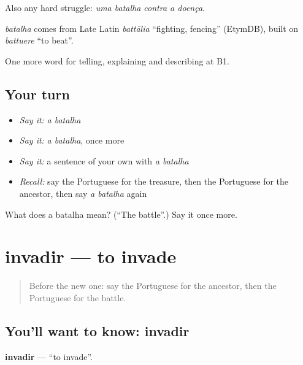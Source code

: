 Also any hard struggle: \emph{uma batalha contra a doença}.

\begin{cousinweb}
\emph{batalha} comes from Late Latin \emph{battālia} \textquotedblleft{}fighting, fencing\textquotedblright{} (EtymDB), built on \emph{battuere} \textquotedblleft{}to beat\textquotedblright{}.
\end{cousinweb}

\begin{grammarlens}[title={What you've built}]
One more word for telling, explaining and describing at B1.
\end{grammarlens}

\subsection*{Your turn}
\begin{itemize}
\raggedright
  \item \emph{Say it:} \emph{a batalha}
  \item \emph{Say it:} \emph{a batalha}, once more
  \item \emph{Say it:} a sentence of your own with \emph{a batalha}
  \item \emph{Recall:} say the Portuguese for the treasure, then the Portuguese for the ancestor, then say \emph{a batalha} again
\end{itemize}

\begin{tcolorbox}[breakable,colback=teal!4,colframe=teal!35!black,title={Before you move on}]
What does a batalha mean? (\textquotedblleft{}The battle\textquotedblright{}.) Say it once more.
\end{tcolorbox}
\section[invadir]{invadir — to invade}

\label{lesson:PT-C329-invadir}



\begin{quote}
Before the new one: say the Portuguese for the ancestor, then the Portuguese for the battle.
\end{quote}

\subsection*{You'll want to know: invadir}
\textbf{invadir} — \textquotedblleft{}to invade\textquotedblright{}.

